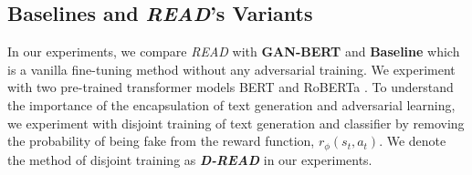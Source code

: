 \documentclass[11pt]{article}
\begin{document}

\subsection{Baselines and \textit{\textbf{READ}}'s Variants}
In our experiments, we compare \textit{READ} with \textbf{GAN-BERT} and \textbf{Baseline} which is a vanilla fine-tuning method without any adversarial training. We experiment with two pre-trained transformer models BERT \cite{devlin-etal-2019-bert} and RoBERTa \cite{liu2019roberta}. To understand the importance of the encapsulation of text generation and adversarial learning, we experiment with disjoint training of text generation and classifier by removing the probability of being fake from the reward function, $r_{\phi}(s_{t}, a_{t})$. We denote the method of disjoint training as \textit{\textbf{D-READ}} in our experiments.








\end{document}
